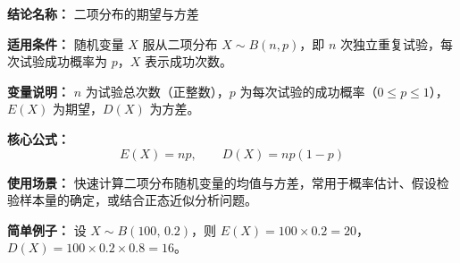 \textbf{结论名称：} 二项分布的期望与方差

\textbf{适用条件：} 随机变量 $X$ 服从二项分布 $X\sim B(n,p)$，即 $n$ 次独立重复试验，每次试验成功概率为 $p$，$X$ 表示成功次数。

\textbf{变量说明：} $n$ 为试验总次数（正整数），$p$ 为每次试验的成功概率（$0\leq p\leq 1$），$E(X)$ 为期望，$D(X)$ 为方差。

\textbf{核心公式：}
\[
\boxed{E(X)=np,\qquad D(X)=np(1-p)}
\]

\textbf{使用场景：} 快速计算二项分布随机变量的均值与方差，常用于概率估计、假设检验样本量的确定，或结合正态近似分析问题。

\textbf{简单例子：} 设 $X\sim B(100,\,0.2)$，则 $E(X)=100\times 0.2=20$，$D(X)=100\times 0.2\times 0.8=16$。